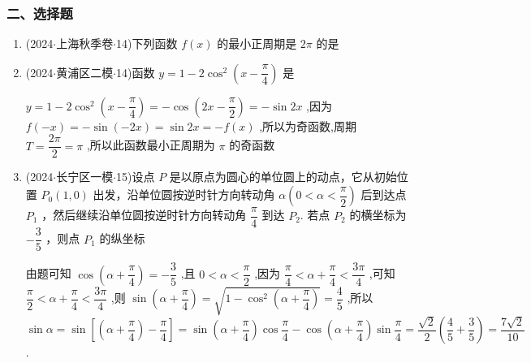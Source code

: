 \subsubsection*{二、选择题}
\begin{enumerate}
    \item (2024$\cdot$上海秋季卷$\cdot$14)下列函数 $f\left( x\right)$ 的最小正周期是 ${2\pi }$ 的是 

    \item (2024$\cdot$黄浦区二模$\cdot$14)函数 $y = 1 - 2{\cos }^{2}\left( {x - \dfrac{\pi }{4}}\right)$ 是 
    \begin{jieda}
        $y = 1 - 2{\cos }^{2}\left( {x - \dfrac{\pi }{4}}\right)  =   - \cos \left( {{2x} - \dfrac{\pi }{2}}\right)  =  - \sin {2x}$ ,因为 $f\left( {-x}\right)  =  - \sin \left( {-{2x}}\right)  =  \sin {2x} =  - f\left( x\right)$ ,所以为奇函数,周期 $T = \dfrac{2\pi }{2} = \pi$ ,所以此函数最小正周期为 $\pi$ 的奇函数
    \end{jieda}

    \item (2024$\cdot$长宁区一模$\cdot$15)设点 $P$ 是以原点为圆心的单位圆上的动点，它从初始位置 ${P}_{0}\left( {1,0}\right)$ 出发，沿单位圆按逆时针方向转动角 $\alpha \left( {0 < \alpha  < \dfrac{\pi }{2}}\right)$ 后到达点 ${P}_{1}$ ，然后继续沿单位圆按逆时针方向转动角 $\dfrac{\pi }{4}$ 到达 ${P}_{2}$. 若点 ${P}_{2}$ 的横坐标为 $- \dfrac{3}{5}$ ，则点 ${P}_{1}$ 的纵坐标 
    \begin{jieda}
        由题可知 $\cos \left( {\alpha  + \dfrac{\pi }{4}}\right)  =  - \dfrac{3}{5}$ ,且 $0 < \alpha  < \dfrac{\pi }{2}$ ,因为 $\dfrac{\pi }{4} < \alpha  + \dfrac{\pi }{4} < \dfrac{3\pi }{4}$ ,可知 $\dfrac{\pi }{2} < \alpha  + \dfrac{\pi }{4} < \dfrac{3\pi }{4}$ ,则 $\sin \left( {\alpha  + \dfrac{\pi }{4}}\right)  =  \sqrt{1 - {\cos }^{2}\left( {\alpha  + \dfrac{\pi }{4}}\right) } = \dfrac{4}{5}$ ,所以 $\sin \alpha  = \sin \left\lbrack  {\left( {\alpha  + \dfrac{\pi }{4}}\right)  - \dfrac{\pi }{4}}\right\rbrack   =  \sin \left( {\alpha  + \dfrac{\pi }{4}}\right) \cos \dfrac{\pi }{4} - \cos \left( {\alpha  + \dfrac{\pi }{4}}\right) \sin \dfrac{\pi }{4} = \dfrac{\sqrt{2}}{2}\left( {\dfrac{4}{5} + \dfrac{3}{5}}\right)  =  \dfrac{7\sqrt{2}}{10}$.
    \end{jieda}
\end{enumerate}

